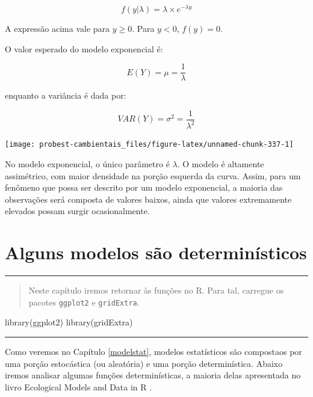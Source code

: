\documentclass[
]{book}
\newenvironment{Shaded}{\begin{snugshade}}{\end{snugshade}}
\newcommand{\FunctionTok}[1]{\textcolor[rgb]{0.00,0.00,0.00}{#1}}
\newcommand{\NormalTok}[1]{#1}
\begin{document}
\[f(y|\lambda) = \lambda \times e^{-\lambda y}\]

A expressão acima vale para \(y \ge 0\). Para \(y < 0\), \(f(y) = 0\).

O valor esperado do modelo exponencial é:

\[E(Y) = \mu = \frac{1}{\lambda}\]

enquanto a variância é dada por:

\[VAR(Y) = \sigma^2 = \frac{1}{\lambda^2}\]

\begin{center}\texttt{[image: probest-cambientais\_files/figure-latex/unnamed-chunk-337-1]} \end{center}

No modelo exponencial, o único parâmetro é \(\lambda\). O modelo é altamente assimétrico, com maior densidade na porção esquerda da curva. Assim, para um fenômeno que possa ser descrito por um modelo exponencial, a maioria das observações será composta de valores baixos, ainda que valores extremamente elevados possam surgir ocasionalmente.

\hypertarget{detmodel}{%
\chapter{Alguns modelos são determinísticos}\label{detmodel}}

\begin{center}\rule{0.5\linewidth}{0.5pt}\end{center}

\begin{quote}
Neste capítulo iremos retornar às funções no R. Para tal, carregue os pacotes \texttt{ggplot2} e \texttt{gridExtra}.
\end{quote}

\begin{Shaded}
\begin{Highlighting}[]
\FunctionTok{library}\NormalTok{(ggplot2)}
\FunctionTok{library}\NormalTok{(gridExtra)}
\end{Highlighting}
\end{Shaded}

\begin{center}\rule{0.5\linewidth}{0.5pt}\end{center}

Como veremos no Capítulo \ref{modelstat}, modelos estatísticos são compostaos por uma porção estocástica (ou aleatória) e uma porção determinística. Abaixo iremos analisar algumas funções determinísticas, a maioria delas apresentada no livro Ecological Models and Data in R \citep{bolker2008ecological}.
\end{document}
